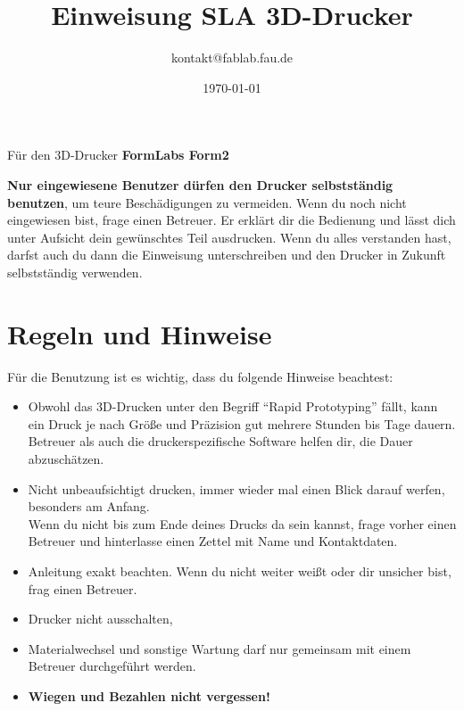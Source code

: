 \documentclass{\basedir/fablab-document}
\date{\today}
\author{kontakt@fablab.fau.de}
\title{Einweisung SLA 3D-Drucker}
\begin{document}
	
	\maketitle
	\begin{center}
		Für den 3D-Drucker \textbf{FormLabs Form2}
	\end{center}
	
	\textbf{Nur eingewiesene Benutzer dürfen den Drucker selbstständig benutzen}, um teure Beschädigungen zu vermeiden. Wenn du noch nicht eingewiesen bist, frage einen Betreuer. Er erklärt dir die Bedienung und lässt dich unter Aufsicht dein gewünschtes Teil ausdrucken. Wenn du alles verstanden hast, darfst auch du dann die Einweisung unterschreiben und den Drucker in Zukunft selbstständig verwenden.
	
	\section{Regeln und Hinweise}
	Für die Benutzung ist es wichtig, dass du folgende Hinweise beachtest:
	
	\begin{itemize}
		\item Obwohl das 3D-Drucken unter den Begriff ``Rapid Prototyping'' fällt, kann ein Druck je nach Größe und
		Präzision gut mehrere Stunden bis Tage dauern. Betreuer als auch die druckerspezifische Software helfen dir, die Dauer abzuschätzen.
		\item Nicht unbeaufsichtigt drucken, immer wieder mal einen Blick darauf werfen, besonders am Anfang.\\
		Wenn du nicht bis zum Ende deines Drucks da sein kannst, frage vorher einen Betreuer und hinterlasse einen Zettel mit Name und Kontaktdaten.
		\item Anleitung exakt beachten. Wenn du nicht weiter weißt oder dir unsicher bist, frag einen Betreuer.
		\item Drucker nicht ausschalten,
		\item Materialwechsel und sonstige Wartung darf nur gemeinsam mit einem Betreuer durchgeführt werden.
		\item \textbf{Wiegen und Bezahlen nicht vergessen!}
	\end{itemize}
	\newpage
	
	
	\renewcommand{\contentsname}{Inhaltsverzeichnis / Arbeitsablauf}
	\setcounter{tocdepth}{2}
	\tableofcontents
	\newpage
	
\end{document}
